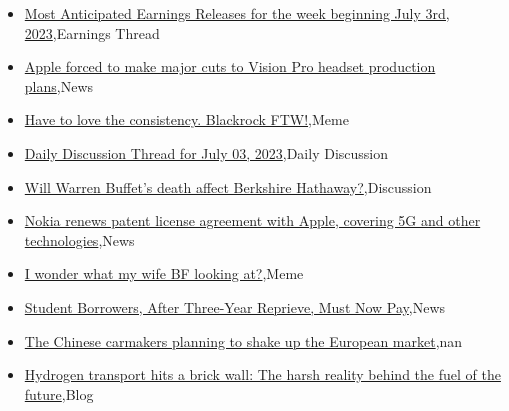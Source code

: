 \documentclass{article}%
\begin{document}
%
\begin{itemize}%
\item%
\href{https://reddit.com/r/wallstreetbets/comments/14pggll/most\_anticipated\_earnings\_releases\_for\_the\_week/}{Most Anticipated Earnings Releases for the week beginning July 3rd, 2023},Earnings Thread%
\item%
\href{https://reddit.com/r/wallstreetbets/comments/14ph15x/apple\_forced\_to\_make\_major\_cuts\_to\_vision\_pro/}{Apple forced to make major cuts to Vision Pro headset production plans},News%
\item%
\href{https://reddit.com/r/wallstreetbets/comments/14pgsxe/have\_to\_love\_the\_consistency\_blackrock\_ftw/}{Have to love the consistency. Blackrock FTW!},Meme%
\item%
\href{https://reddit.com/r/wallstreetbets/comments/14peqn4/daily\_discussion\_thread\_for\_july\_03\_2023/}{Daily Discussion Thread for July 03, 2023},Daily Discussion%
\item%
\href{https://reddit.com/r/wallstreetbets/comments/14papl5/will\_warren\_buffets\_death\_affect\_berkshire/}{Will Warren Buffet's death affect Berkshire Hathaway?},Discussion%
\item%
\href{https://reddit.com/r/wallstreetbets/comments/14p9ja1/nokia\_renews\_patent\_license\_agreement\_with\_apple/}{Nokia renews patent license agreement with Apple, covering 5G and other technologies},News%
\item%
\href{https://reddit.com/r/wallstreetbets/comments/14p8nqc/i\_wonder\_what\_my\_wife\_bf\_looking\_at/}{I wonder what my wife BF looking at?},Meme%
\item%
\href{https://reddit.com/r/Economics/comments/14pfjyn/student\_borrowers\_after\_threeyear\_reprieve\_must/}{Student Borrowers, After Three-Year Reprieve, Must Now Pay},News%
\item%
\href{https://reddit.com/r/Economics/comments/14p0m20/the\_chinese\_carmakers\_planning\_to\_shake\_up\_the/}{The Chinese carmakers planning to shake up the European market},nan%
\item%
\href{https://reddit.com/r/Economics/comments/14ohhax/hydrogen\_transport\_hits\_a\_brick\_wall\_the\_harsh/}{Hydrogen transport hits a brick wall: The harsh reality behind the fuel of the future},Blog%
\end{itemize}%
\end{document}
